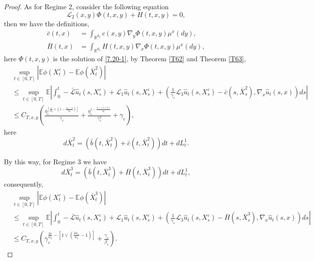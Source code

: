 \documentclass[11pt,reqno]{amsart}
\numberwithin{equation}{section}
\begin{document}
\begin{proof}
As for Regime 2, consider the following equation
\begin{equation}\label{7.20-1}
	\mathcal{L}_{2}(x,y)\Phi(t,x,y)+H(t,x,y)=0,
\end{equation}
then we have the definitions,
\begin{equation}
	\begin{split}
		\bar{c}(t,x)&=\int_{\mathbb{R}^{ d_{2}}}c(x,y)\nabla_{y}\Phi(t,x,y)\mu^{x}(dy),\\
		\bar{H}(t,x)&=\int_{\mathbb{R}^{ d_{2}}}H(t,x,y)\nabla_{x}\Phi(t,x,y)\mu^{x}(dy),
	\end{split}	\nonumber
\end{equation}
here $\Phi(t,x,y)$ is the solution of \eqref{7.20-1}, by Theorem \ref{T62} and Theorem \ref{T63},
\begin{equation}\label{7.20}
	\begin{split}
		&\sup_{t\in [0,T]}|\mathbb{E}\phi(X_{t}^{\varepsilon})-\mathbb{E}\phi(\bar{X}^{2}_{t})|\\
		&\leq\sup_{t\in [0,T]}\mathbb{E} \left|\int_{0}^{t}-\mathcal{\bar{L}}\hat{u}_{t}(s,X_{s}^{\varepsilon})+\mathcal{L}_{1}\hat{u}_{t}(s,X_{s}^{\varepsilon}) +(\frac{1}{\gamma_{\varepsilon}} \mathcal{L}_{3}\hat{u}_{t}(s,X_{s}^{\varepsilon})-\bar{c}(s,\bar{X}^{2}_{s}),\nabla_{x}\hat{u}_{t}(s,x))ds \right| \\
		&\leq C_{T,x,y}\left(\frac{ \eta_{\varepsilon}^{\left[ \frac{v}{\alpha_{2}}\wedge \left( 1-\frac{\alpha_{1}-v}{\alpha_{2}} \right)  \right]  }}{\gamma_{\varepsilon}}+\frac{ \eta_{\varepsilon}^{1-\frac{1-(1\wedge v)}{\alpha_{2}}}}{\gamma^{2}_{\varepsilon}}+\gamma_{\varepsilon}\right),
	\end{split}\nonumber
\end{equation}
here
\begin{equation}\label{7.21}
	d\bar{X}^{2}_{t}=(\bar{b}(t,\bar{X}^{2}_{t})+\bar{c}(t,\bar{X}^{2}_{t}))dt+dL_{t}^{1}.
\end{equation}


By this way, for Regime 3 we have 
\begin{equation}\label{7.23}
	d\bar{X}^{3}_{t}=(\bar{b}(t,\bar{X}^{3}_{t})+\bar{H}(t,\bar{X}^{3}_{t}))dt+dL_{t}^{1},
\end{equation}
consequently,
\begin{equation}\label{7.24}
	\begin{split}
		&\sup_{t\in [0,T]}|\mathbb{E}\phi(X_{t}^{\varepsilon})-\mathbb{E}\phi(\bar{X}^{3}_{t})|\\
		&\leq\sup_{t\in [0,T]}\mathbb{E} \left|\int_{0}^{t}-\mathcal{\bar{L}}\hat{u}_{t}(s,X_{s}^{\varepsilon})+\mathcal{L}_{1}\hat{u}_{t}(s,X_{s}^{\varepsilon}) +(\frac{1}{\gamma_{\varepsilon}} \mathcal{L}_{3}\hat{u}_{t}(s,X_{s}^{\varepsilon})-\bar{H}(s,\bar{X}^{3}_{s}),\nabla_{x}\hat{u}_{t}(s,x))ds \right| \\
		&\leq C_{T,x,y}\left( \gamma_{\varepsilon}^{\frac{2v}{\alpha_{2}}-\left[ 1\vee \left( \frac{2\alpha_{1}}{\alpha_{2}}-1\right)   \right] }+\frac{\gamma_{\varepsilon}}{\beta_{\varepsilon}}\right) .
	\end{split}\nonumber
\end{equation}


\end{proof}
\end{document}
